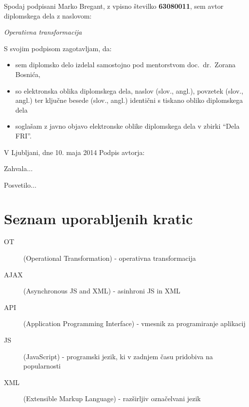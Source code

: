 \documentclass[a4paper, 12pt, twoside]{book}
\newcommand{\clearemptydoublepage}{\newpage{\pagestyle{empty}\cleardoublepage}} %
\begin{document}
\vspace{1cm}
\noindent Spodaj podpisani Marko Bregant, z vpisno številko \textbf{63080011}, sem avtor di\-plomskega dela z naslovom:

\vspace{0.5cm}
{\large \emph{Operativna transformacija}}

\vspace{1.5cm}
\noindent S svojim podpisom zagotavljam, da:
\begin{itemize}
	\item sem diplomsko delo izdelal samostojno pod mentorstvom doc.\ dr.\ Zorana Bosnića,
	\item so elektronska oblika diplomskega dela, naslov (slov., angl.), povzetek (slov., angl.) ter ključne besede (slov., angl.) identični s tiskano obliko diplomskega dela
	\item soglašam z javno objavo elektronske oblike diplomskega dela v zbirki “Dela FRI”.
\end{itemize}

\vspace{1cm}
\noindent V Ljubljani, dne 10. maja 2014 \hfill Podpis avtorja:

\clearemptydoublepage

\thispagestyle{empty}
\noindent Zahvala...

\clearemptydoublepage

\thispagestyle{empty}
\noindent Posvetilo...

\clearemptydoublepage

\def\thepage{} %
\tableofcontents{}

\chapter*{Seznam uporabljenih kratic}
\begin{description}                   
	\item[OT] (Operational Transformation) - operativna transformacija
    \item[AJAX] (Asynchronous JS and XML) - asinhroni JS in XML
    \item[API] (Application Programming Interface) - vmesnik za programiranje aplikacij
	\item[JS] (JavaScript) - programski jezik, ki v zadnjem času pridobiva na popularnosti
    \item[XML] (Extensible Markup Language) - razširljiv označelvani jezik
\end{description}
\end{document}
